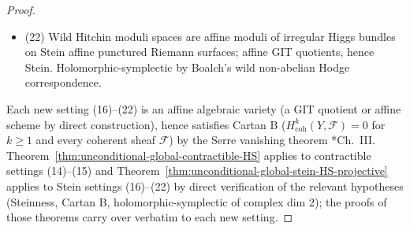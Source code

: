 \begin{proof}
\begin{itemize}
        $T^*\C^n$ by sub-tori; Stein affine for smooth arrangements.
        Holomorphic-symplectic by hyperkähler reduction.
  \item (22) Wild Hitchin moduli spaces are affine moduli of
        irregular Higgs bundles on Stein affine punctured Riemann
        surfaces; affine GIT quotients, hence Stein.
        Holomorphic-symplectic by Boalch's wild non-abelian Hodge
        correspondence.
\end{itemize}
Each new setting (16)--(22) is an affine algebraic variety (a GIT
quotient or affine scheme by direct construction), hence satisfies
Cartan B (\(H^k_{\mathrm{coh}}(Y,\mathcal F)=0\) for $k\geq 1$ and
every coherent sheaf $\mathcal F$) by the Serre vanishing theorem
\cite{hartshorne-local-cohomology}*{Ch.~III}.
Theorem~\ref{thm:unconditional-global-contractible-HS} applies to
contractible settings (14)--(15) and
Theorem~\ref{thm:unconditional-global-stein-HS-projective} applies
to Stein settings (16)--(22) by direct verification of the
relevant hypotheses (Steinness, Cartan B, holomorphic-symplectic of
complex dim 2); the proofs of those theorems carry over verbatim
to each new setting.
\end{proof}

